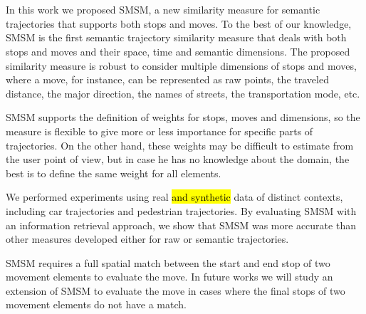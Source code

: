 %


\chapter[Conclusion]{} \label{sec:conclusions}
{}%
In this work we proposed SMSM, a new similarity measure for semantic trajectories that supports both stops and moves.  To the best of our knowledge, SMSM is the first semantic trajectory similarity measure that deals with both stops and moves and their space, time and semantic dimensions. The proposed similarity measure is robust  to consider multiple dimensions of stops and moves, where a move, for instance, can be represented as raw points, the traveled distance, the major direction, the names of streets, the transportation mode, etc.

SMSM supports the definition of weights for stops, moves and dimensions, so the measure is flexible to give more or less importance for specific parts of trajectories. On the other hand, these weights may be difficult to estimate from the user point of view, but in case he has no knowledge about the domain, the best is to define the same weight for all elements.

We performed experiments using real \hl{and synthetic} data of distinct contexts, including car trajectories and pedestrian trajectories. By evaluating SMSM with an information retrieval approach, we show that SMSM was more accurate than other measures developed either for raw or semantic trajectories.

SMSM requires a full spatial match between the start and end stop of two movement elements to evaluate the move. In future works we will study an extension of SMSM to evaluate the move in cases where the final stops of two movement elements do not have a match.
